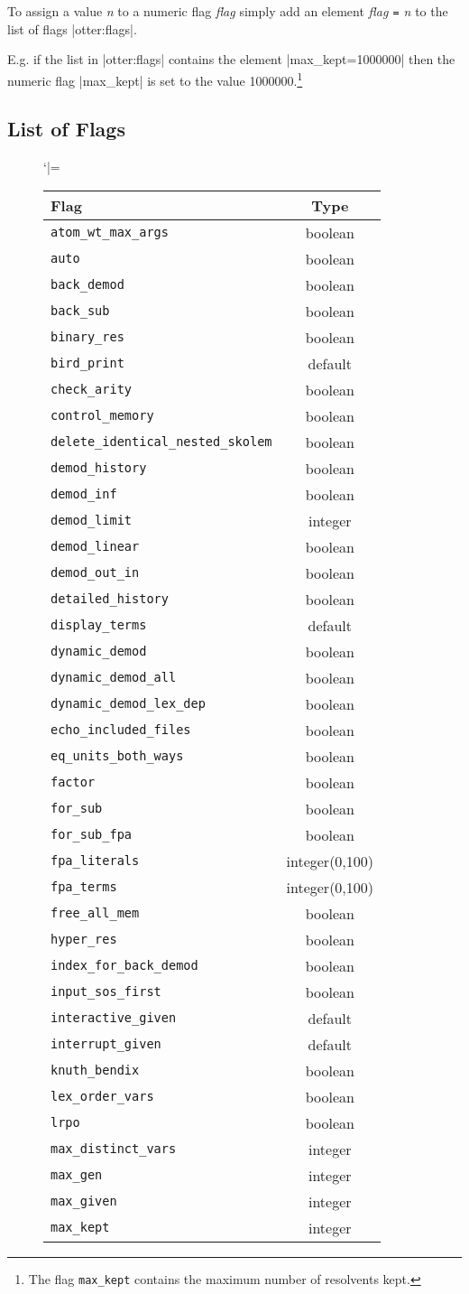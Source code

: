 To assign a value {\em n}\/ to a numeric flag {\em flag}\/ simply add an
element {\em flag {\tt=} n} to the list of flags |otter:flags|.

E.g. if the list in |otter:flags| contains the element |max_kept=1000000| then
the numeric flag |max_kept| is set to the value 1000000.\footnote{The flag
  {\tt max\_kept} contains the maximum number of resolvents kept.}


\subsection{List of Flags}

\begin{figure}[t]
{\scriptsize
\catcode`|=\other
\def\OtterFlag#1#2.{\tt #1&#2\\\hline}%
\null\hfill
\begin{tabular}{|p{15em}c|}\hline \bf Flag & \bf Type \\\hline\hline
  \OtterFlag{atom\_wt\_max\_args	}{boolean}.
  \OtterFlag{auto			}{boolean}.
  \OtterFlag{back\_demod		}{boolean}.
  \OtterFlag{back\_sub			}{boolean}.
  \OtterFlag{binary\_res		}{boolean}.
  \OtterFlag{bird\_print		}{default}.
  \OtterFlag{check\_arity		}{boolean}.
  \OtterFlag{control\_memory		}{boolean}.
  \OtterFlag{delete\_identical\_nested\_skolem}{boolean}.
  \OtterFlag{demod\_history		}{boolean}.
  \OtterFlag{demod\_inf			}{boolean}.
  \OtterFlag{demod\_limit		}{integer}.
  \OtterFlag{demod\_linear		}{boolean}.
  \OtterFlag{demod\_out\_in		}{boolean}.
  \OtterFlag{detailed\_history		}{boolean}.
  \OtterFlag{display\_terms		}{default}.
  \OtterFlag{dynamic\_demod		}{boolean}.
  \OtterFlag{dynamic\_demod\_all	}{boolean}.
  \OtterFlag{dynamic\_demod\_lex\_dep	}{boolean}.
  \OtterFlag{echo\_included\_files	}{boolean}.
  \OtterFlag{eq\_units\_both\_ways	}{boolean}.
  \OtterFlag{factor			}{boolean}.
  \OtterFlag{for\_sub			}{boolean}.
  \OtterFlag{for\_sub\_fpa		}{boolean}.
  \OtterFlag{fpa\_literals		}{integer(0,100)}.
  \OtterFlag{fpa\_terms			}{integer(0,100)}.
  \OtterFlag{free\_all\_mem		}{boolean}.
  \OtterFlag{hyper\_res			}{boolean}.
  \OtterFlag{index\_for\_back\_demod 	}{boolean}.
  \OtterFlag{input\_sos\_first		}{boolean}.
  \OtterFlag{interactive\_given		}{default}.
  \OtterFlag{interrupt\_given		}{default}.
  \OtterFlag{knuth\_bendix		}{boolean}.
  \OtterFlag{lex\_order\_vars		}{boolean}.
  \OtterFlag{lrpo			}{boolean}.
  \OtterFlag{max\_distinct\_vars	}{integer}.
  \OtterFlag{max\_gen			}{integer}.
  \OtterFlag{max\_given			}{integer}.
  \OtterFlag{max\_kept			}{integer}.

\end{tabular}}
\end{figure}
